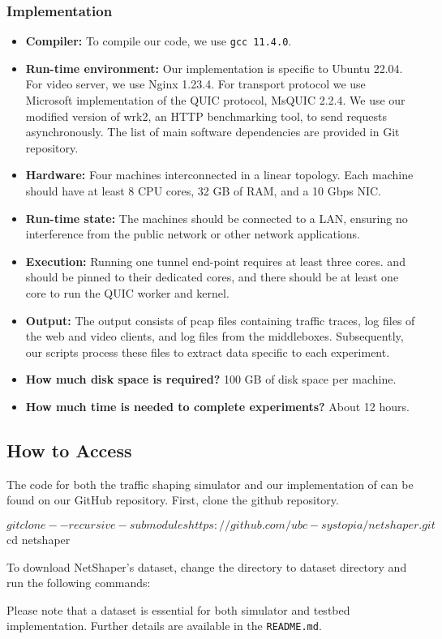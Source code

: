 \subsubsection{{\sys} Implementation}
\label{subsubsec:check-list-testbed}
\begin{itemize}
  \setlength{\itemsep}{1pt}
  \item \textbf{Compiler:} To compile our code, we use \texttt{gcc 11.4.0}.
  \item \textbf{Run-time environment:} Our implementation is specific to Ubuntu 22.04. For video server, we use Nginx 1.23.4. For transport protocol we use Microsoft implementation of the QUIC protocol, MsQUIC 2.2.4. We use our modified version of wrk2, an HTTP benchmarking tool, to send requests asynchronously. 
  The list of main software dependencies are provided in Git repository.
  \item \textbf{Hardware:} Four machines interconnected in a linear topology. Each machine should have at least 8 CPU cores, 32 GB of RAM, and a 10 Gbps NIC.
  \item \textbf{Run-time state:} The machines should be connected to a LAN, ensuring no interference from the public network or other network applications.
  \item \textbf{Execution:} Running one tunnel end-point requires at least three cores. {\ushaper} and {\dshaper} should be pinned to their dedicated cores, and there should be at least one core to run the QUIC worker and kernel. 
  \item \textbf{Output: } The output consists of pcap files containing traffic traces, log files of the web and video clients, and log files from the middleboxes. Subsequently, our scripts process these files to extract data specific to each experiment.
  \item \textbf{How much disk space is required?} 100 GB of disk space per machine.
  \item \textbf{How much time is needed to complete experiments?} About 12 hours.
\end{itemize}



\subsection{How to Access}
\label{subsec:how-to-access}
The code for both the traffic shaping simulator and our implementation of {\sys} can be found on our GitHub repository.
First, clone the github repository.
\begin{bashcode}
  $ git clone --recursive-submodules https://github.com/ubc-systopia/netshaper.git
  $ cd netshaper
\end{bashcode}
To download NetShaper's dataset, change the directory to dataset directory and run the following commands:
Please note that a dataset is essential for both simulator and testbed implementation. Further details are available in the \texttt{README.md}.

